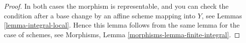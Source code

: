 \documentclass[10pt,a4paper]{amsart}
\theoremstyle{plain}
\theoremstyle{definition}
\theoremstyle{remark}
\numberwithin{equation}{subsection}
\begin{document}
\begin{proof}
In both cases the morphism is representable, and you can check the condition
after a base change by an affine scheme mapping into $Y$, see
Lemmas \ref{lemma-integral-local}. Hence this lemma follows from the
same lemma for the case of schemes, see
Morphisms, Lemma \ref{morphisms-lemma-finite-integral}.
\end{proof}
\end{document}
